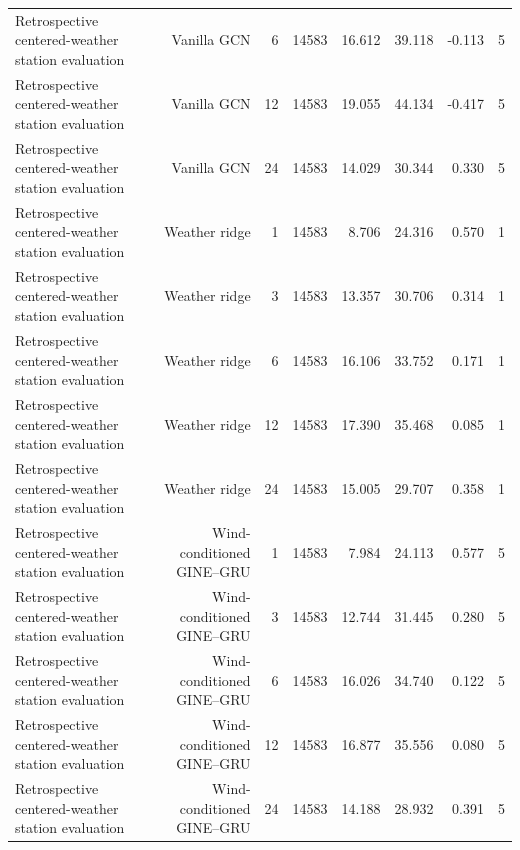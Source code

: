 \begin{table}[t]
\begin{tabular}{lrrrrrrr}
Retrospective centered-weather station evaluation & Vanilla GCN & 6 & 14583 & 16.612 & 39.118 & -0.113 & 5 \\
Retrospective centered-weather station evaluation & Vanilla GCN & 12 & 14583 & 19.055 & 44.134 & -0.417 & 5 \\
Retrospective centered-weather station evaluation & Vanilla GCN & 24 & 14583 & 14.029 & 30.344 & 0.330 & 5 \\
Retrospective centered-weather station evaluation & Weather ridge & 1 & 14583 & 8.706 & 24.316 & 0.570 & 1 \\
Retrospective centered-weather station evaluation & Weather ridge & 3 & 14583 & 13.357 & 30.706 & 0.314 & 1 \\
Retrospective centered-weather station evaluation & Weather ridge & 6 & 14583 & 16.106 & 33.752 & 0.171 & 1 \\
Retrospective centered-weather station evaluation & Weather ridge & 12 & 14583 & 17.390 & 35.468 & 0.085 & 1 \\
Retrospective centered-weather station evaluation & Weather ridge & 24 & 14583 & 15.005 & 29.707 & 0.358 & 1 \\
Retrospective centered-weather station evaluation & Wind-conditioned GINE–GRU & 1 & 14583 & 7.984 & 24.113 & 0.577 & 5 \\
Retrospective centered-weather station evaluation & Wind-conditioned GINE–GRU & 3 & 14583 & 12.744 & 31.445 & 0.280 & 5 \\
Retrospective centered-weather station evaluation & Wind-conditioned GINE–GRU & 6 & 14583 & 16.026 & 34.740 & 0.122 & 5 \\
Retrospective centered-weather station evaluation & Wind-conditioned GINE–GRU & 12 & 14583 & 16.877 & 35.556 & 0.080 & 5 \\
Retrospective centered-weather station evaluation & Wind-conditioned GINE–GRU & 24 & 14583 & 14.188 & 28.932 & 0.391 & 5 \\
\hline
\end{tabular}
\end{table}
